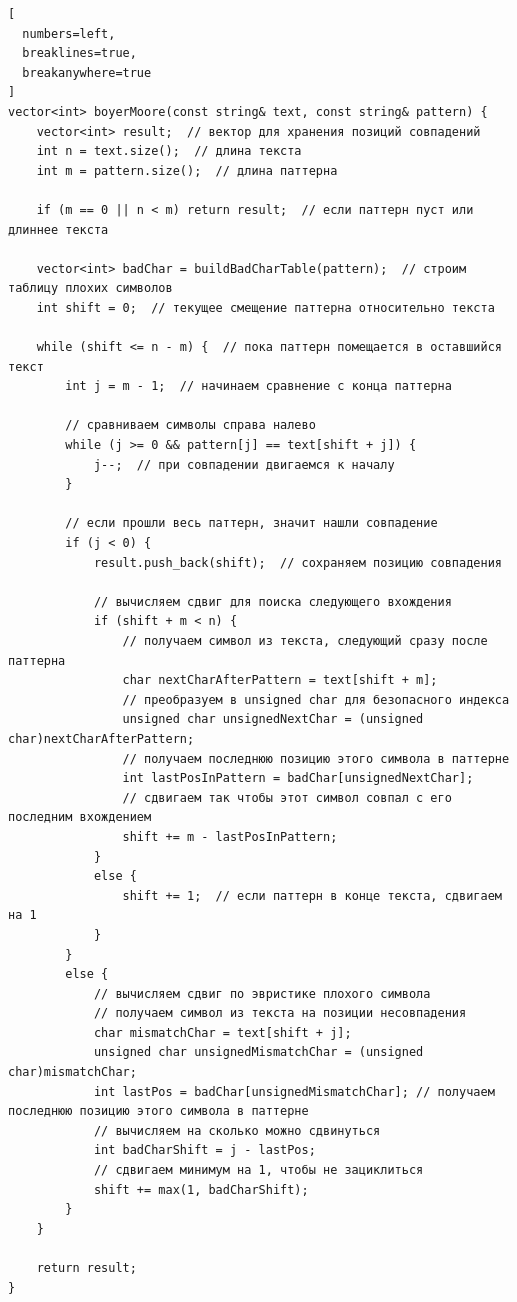 \documentclass[otchet]{SCWorks}
\begin{document}
\begin{Verbatim}[
  numbers=left,
  breaklines=true,
  breakanywhere=true
]
vector<int> boyerMoore(const string& text, const string& pattern) {
    vector<int> result;  // вектор для хранения позиций совпадений
    int n = text.size();  // длина текста
    int m = pattern.size();  // длина паттерна

    if (m == 0 || n < m) return result;  // если паттерн пуст или длиннее текста

    vector<int> badChar = buildBadCharTable(pattern);  // строим таблицу плохих символов
    int shift = 0;  // текущее смещение паттерна относительно текста

    while (shift <= n - m) {  // пока паттерн помещается в оставшийся текст
        int j = m - 1;  // начинаем сравнение с конца паттерна

        // сравниваем символы справа налево
        while (j >= 0 && pattern[j] == text[shift + j]) {
            j--;  // при совпадении двигаемся к началу
        }

        // если прошли весь паттерн, значит нашли совпадение
        if (j < 0) {
            result.push_back(shift);  // сохраняем позицию совпадения

            // вычисляем сдвиг для поиска следующего вхождения
            if (shift + m < n) {
                // получаем символ из текста, следующий сразу после паттерна
                char nextCharAfterPattern = text[shift + m];
                // преобразуем в unsigned char для безопасного индекса
                unsigned char unsignedNextChar = (unsigned char)nextCharAfterPattern;
                // получаем последнюю позицию этого символа в паттерне
                int lastPosInPattern = badChar[unsignedNextChar];
                // сдвигаем так чтобы этот символ совпал с его последним вхождением
                shift += m - lastPosInPattern;
            }
            else {
                shift += 1;  // если паттерн в конце текста, сдвигаем на 1
            }
        }
        else {
            // вычисляем сдвиг по эвристике плохого символа
            // получаем символ из текста на позиции несовпадения
            char mismatchChar = text[shift + j];
            unsigned char unsignedMismatchChar = (unsigned char)mismatchChar;
            int lastPos = badChar[unsignedMismatchChar]; // получаем последнюю позицию этого символа в паттерне
            // вычисляем на сколько можно сдвинуться
            int badCharShift = j - lastPos;
            // сдвигаем минимум на 1, чтобы не зациклиться
            shift += max(1, badCharShift);
        }
    }

    return result;
}
\end{Verbatim}
\end{document}
